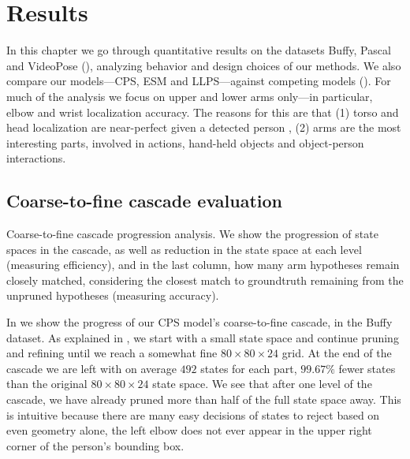 \chapter{Results}\label{sec:results}

In this chapter we go through quantitative results on the datasets Buffy, 
Pascal and VideoPose (), analyzing behavior and design choices 
of our methods.  We also compare our models---CPS, ESM and LLPS---against 
competing models ().  For much of the analysis we focus on 
upper and lower arms only---in particular, elbow and wrist localization 
accuracy.  The reasons for this are that (1) torso and head localization are 
near-perfect given a detected person \citep{deva2011}, (2) arms are the most 
interesting parts, involved in actions, hand-held objects and object-person 
interactions.


\section{Coarse-to-fine cascade evaluation}
 \begin{table}[tb]
\begin{center}

\caption[Coarse-to-fine cascade progression analysis.]{Coarse-to-fine cascade 
progression analysis. We show the progression of state spaces in the cascade, 
as well as reduction in the state space at each level (measuring efficiency), 
and in the last column, how many arm hypotheses remain closely matched, 
considering the closest match to groundtruth remaining from the unpruned 
hypotheses (measuring accuracy). }
\label{tab:c2f} 
\end{center}
\end{table}

In  we show the progress of our CPS model's coarse-to-fine cascade, 
in the Buffy dataset.
As explained in , we start with a small state space and 
continue pruning and refining until we reach a somewhat fine $80 \times 80 
\times 24$ grid.  At the end of the cascade we are left with on average $492$ 
states for each part, $99.67\%$ fewer states than the original $80 \times 80 
\times 24$ state space. We see that after one level of the cascade, we have 
already pruned more than half of the full state space away.  This 
is intuitive because there are many easy decisions of states to reject based on 
even geometry alone, \eg the left elbow does not ever appear in the upper right 
corner of the person's bounding box.

